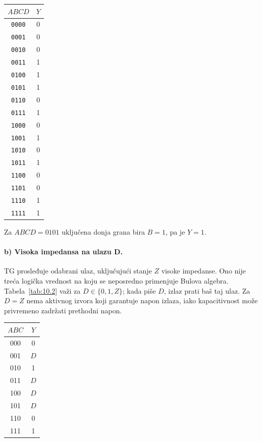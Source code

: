 \documentclass[a4paper,11pt]{article}
\numberwithin{equation}{section}
\newcommand{\redlinija}{\arrayrulecolor{black!28}\specialrule{0.3pt}{2pt}{2pt}\arrayrulecolor{black}}
\begin{document}
\begin{center}\begin{minipage}{\linewidth}\centering{}\label{tab:10.1}\begin{tabular}{cc}\toprule
$ABCD$ & $Y$\\
\midrule
\texttt{0000} & 0\\
\redlinija
\texttt{0001} & 0\\
\redlinija
\texttt{0010} & 0\\
\redlinija
\texttt{0011} & 1\\
\redlinija
\texttt{0100} & 1\\
\redlinija
\texttt{0101} & 1\\
\redlinija
\texttt{0110} & 0\\
\redlinija
\texttt{0111} & 1\\
\redlinija
\texttt{1000} & 0\\
\redlinija
\texttt{1001} & 1\\
\redlinija
\texttt{1010} & 0\\
\redlinija
\texttt{1011} & 1\\
\redlinija
\texttt{1100} & 0\\
\redlinija
\texttt{1101} & 0\\
\redlinija
\texttt{1110} & 1\\
\redlinija
\texttt{1111} & 1\\
\bottomrule\end{tabular}\end{minipage}\end{center}
Za $ABCD=0101$ uključena donja grana bira $B=1$, pa je $Y=1$.
\FloatBarrier{}\paragraph{b) Visoka impedansa na ulazu D.}
TG prosleđuje odabrani ulaz, uključujući stanje $Z$ visoke impedanse. Ono nije treća logička vrednost na koju se neposredno primenjuje Bulova algebra. Tabela~\ref{tab:10.2} važi za $D\in\{0,1,Z\}$; kada piše $D$, izlaz prati baš taj ulaz. Za $D=Z$ nema aktivnog izvora koji garantuje napon izlaza, iako kapacitivnost može privremeno zadržati prethodni napon.
\begin{center}\begin{minipage}{\linewidth}\centering{}\label{tab:10.2}\begin{tabular}{cc}\toprule
$ABC$ & $Y$\\
\midrule
000 & 0\\
\redlinija
001 & $D$\\
\redlinija
010 & 1\\
\redlinija
011 & $D$\\
\redlinija
100 & $D$\\
\redlinija
101 & $D$\\
\redlinija
110 & 0\\
\redlinija
111 & 1\\
\bottomrule\end{tabular}\end{minipage}\end{center}
\end{document}
